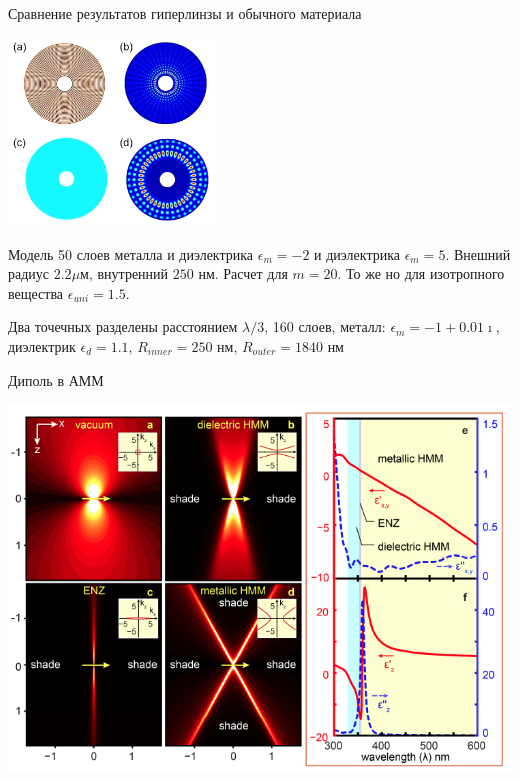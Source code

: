 \documentclass[9pt, compress, xcolor=table]{beamer}
\begin{document}
\begin{frame}{Сравнение результатов гиперлинзы и обычного материала}
\begin{center}
\includegraphics[width=5.5cm]{neg_ref_47}
\end{center}

Модель 50 слоев металла и диэлектрика $\epsilon_m = -2$ и диэлектрика $\epsilon_m = 5$.
Внешний радиус $2.2 \mu$м, внутренний $250$ нм. Расчет для $m=20$. То же но для изотропного
вещества $\epsilon_{uni} = 1.5$.

 Два точечных разделены расстоянием $\lambda/3$, 160 слоев, металл: $\epsilon_m
=-1+0.01 \imath $, диэлектрик $\epsilon_d = 1.1$, $R_{inner} =250$ нм, $R_{outer} = 1840$ нм

\end{frame}

\begin{frame}{Диполь в АММ}
\begin{center}
\includegraphics[width=\textwidth]{neg_ref_n13}
\end{center}
\end{frame}
\end{document}
